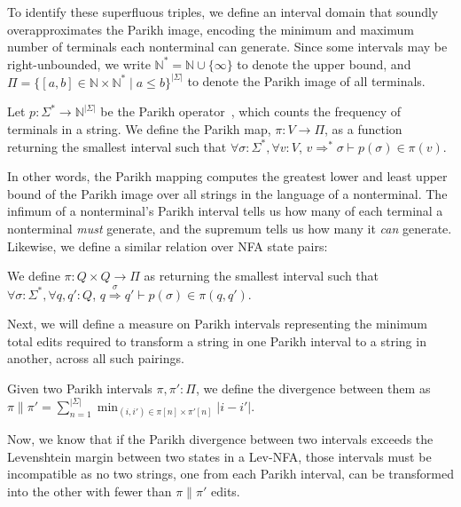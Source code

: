 \documentclass[sigplan,review,acmsmall,nonacm,anonymous]{acmart}\settopmatter{printfolios=false,printccs=false,printacmref=false}
\begin{document}
  To identify these superfluous triples, we define an interval domain that soundly overapproximates the Parikh image, encoding the minimum and maximum number of terminals each nonterminal can generate. Since some intervals may be right-unbounded, we write $\mathbb{N}^*=\mathbb{N} \cup \{\infty\}$ to denote the upper bound, and $\Pi = \{[a, b] \in \mathbb{N} \times \mathbb{N}^* \mid a \leq b\}^{|\Sigma|}$ to denote the Parikh image of all terminals.

  \begin{definition}\label{def:parikh}
    Let $p: \Sigma^*\rightarrow\mathbb{N}^{|\Sigma|}$ be the Parikh operator~\cite{parikh1966context}, which counts the frequency of terminals in a string. We define the Parikh map, $\pi: V \rightarrow \Pi$, as a function returning the smallest interval such that $\forall \sigma: \Sigma^*, \forall v: V$, $v \Rightarrow^* \sigma \vdash p(\sigma) \in \pi(v)$.
  \end{definition}

  In other words, the Parikh mapping computes the greatest lower and least upper bound of the Parikh image over all strings in the language of a nonterminal. The infimum of a nonterminal's Parikh interval tells us how many of each terminal a nonterminal \textit{must} generate, and the supremum tells us how many it \textit{can} generate. Likewise, we define a similar relation over NFA state pairs:

  \begin{definition}
    We define $\pi: Q\times Q \rightarrow \Pi$ as returning the smallest interval such that $\forall \sigma: \Sigma^*, \forall q, q': Q$, $q \overset{\sigma}{\Longrightarrow} q' \vdash p(\sigma) \in \pi(q, q')$.
  \end{definition}

  Next, we will define a measure on Parikh intervals representing the minimum total edits required to transform a string in one Parikh interval to a string in another, across all such pairings.

  \begin{definition}
    Given two Parikh intervals $\pi, \pi': \Pi$, we define the divergence between them as $\pi \parallel \pi' = \sum_{n=1}^{|\Sigma|} \min_{(i, i') \in \pi[n]\times \pi'[n]} |i - i'|$.
  \end{definition}

  Now, we know that if the Parikh divergence between two intervals exceeds the Levenshtein margin between two states in a Lev-NFA, those intervals must be incompatible as no two strings, one from each Parikh interval, can be transformed into the other with fewer than $\pi \parallel \pi'$ edits.
\end{document}
